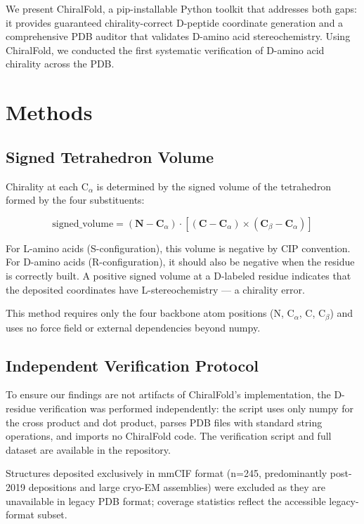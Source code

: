 \documentclass[11pt]{article}
\begin{document}
We present ChiralFold, a pip-installable Python toolkit that addresses both gaps: it provides guaranteed chirality-correct D-peptide coordinate generation and a comprehensive PDB auditor that validates D-amino acid stereochemistry. Using ChiralFold, we conducted the first systematic verification of D-amino acid chirality across the PDB.

\section{Methods}

\subsection{Signed Tetrahedron Volume}

Chirality at each C$_\alpha$ is determined by the signed volume of the tetrahedron formed by the four substituents:

\begin{equation}
\text{signed\_volume} = (\mathbf{N} - \mathbf{C}_\alpha) \cdot \left[ (\mathbf{C} - \mathbf{C}_\alpha) \times (\mathbf{C}_\beta - \mathbf{C}_\alpha) \right]
\end{equation}

For L-amino acids (S-configuration), this volume is negative by CIP convention. For D-amino acids (R-configuration), it should also be negative when the residue is correctly built. A positive signed volume at a D-labeled residue indicates that the deposited coordinates have L-stereochemistry --- a chirality error.

This method requires only the four backbone atom positions (N, C$_\alpha$, C, C$_\beta$) and uses no force field or external dependencies beyond numpy.

\subsection{Independent Verification Protocol}

To ensure our findings are not artifacts of ChiralFold's implementation, the D-residue verification was performed independently: the script uses only numpy for the cross product and dot product, parses PDB files with standard string operations, and imports no ChiralFold code. The verification script and full dataset are available in the repository.

Structures deposited exclusively in mmCIF format (n=245, predominantly post-2019 depositions and large cryo-EM assemblies) were excluded as they are unavailable in legacy PDB format; coverage statistics reflect the accessible legacy-format subset.
\end{document}
